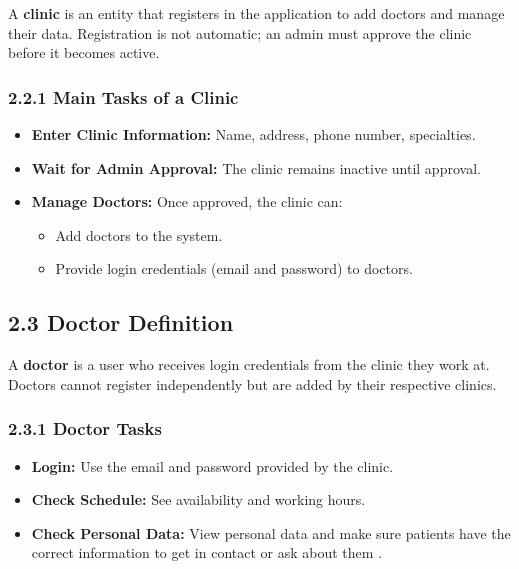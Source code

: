 \documentclass[12pt]{report}
\begin{document}
\noindent A \textbf{clinic} is an entity that registers in the application to add doctors and manage their data. Registration is not automatic; an admin must approve the clinic before it becomes active.

\subsubsection*{\textbf{2.2.1 Main Tasks of a Clinic}}
\begin{itemize}
	\item \textbf{Enter Clinic Information:} Name, address, phone number, specialties.
	\item \textbf{Wait for Admin Approval:} The clinic remains inactive until approval.
	\item \textbf{Manage Doctors:} Once approved, the clinic can:
	      \begin{itemize}
		      \item Add doctors to the system.
		      \item Provide login credentials (email and password) to doctors.
	      \end{itemize}
\end{itemize}

\vspace{0.5cm}
\subsection*{\textbf{2.3 Doctor Definition}}
\noindent A \textbf{doctor} is a user who receives login credentials from the clinic they work at. Doctors cannot register independently but are added by their respective clinics.

\subsubsection*{\textbf{2.3.1 Doctor Tasks}}
\begin{itemize}
	\item \textbf{Login:} Use the email and password provided by the clinic.
	\item \textbf{Check Schedule:} See availability and working hours.
	\item \textbf{Check Personal Data:} View personal data and make sure patients have the correct information to get in contact or ask about them .
\end{itemize}
\end{document}
